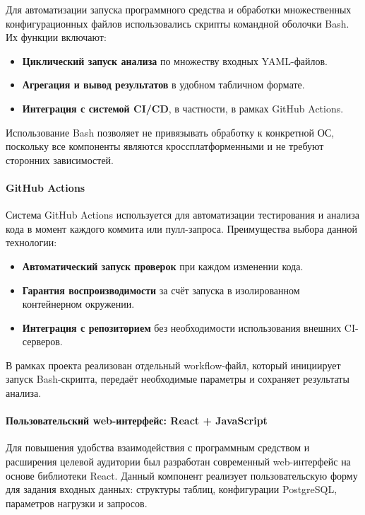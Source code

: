 Для автоматизации запуска программного средства и обработки множественных конфигурационных файлов использовались скрипты командной оболочки Bash. Их функции включают:

\begin{itemize}
  \item \textbf{Циклический запуск анализа} по множеству входных YAML-файлов.
  \item \textbf{Агрегация и вывод результатов} в удобном табличном формате.
  \item \textbf{Интеграция с системой CI/CD}, в частности, в рамках GitHub Actions.
\end{itemize}

Использование Bash позволяет не привязывать обработку к конкретной ОС, поскольку все компоненты являются кроссплатформенными и не требуют сторонних зависимостей.

\paragraph{GitHub Actions}

Система GitHub Actions используется для автоматизации тестирования и анализа кода в момент каждого коммита или пулл-запроса. Преимущества выбора данной технологии:

\begin{itemize}
  \item \textbf{Автоматический запуск проверок} при каждом изменении кода.
  \item \textbf{Гарантия воспроизводимости} за счёт запуска в изолированном контейнерном окружении.
  \item \textbf{Интеграция с репозиторием} без необходимости использования внешних CI-серверов.
\end{itemize}

В рамках проекта реализован отдельный workflow-файл, который инициирует запуск Bash-скрипта, передаёт необходимые параметры и сохраняет результаты анализа.

\paragraph{Пользовательский web-интерфейс: React + JavaScript}

Для повышения удобства взаимодействия с программным средством и расширения целевой аудитории был разработан современный web-интерфейс на основе библиотеки React. Данный компонент реализует пользовательскую форму для задания входных данных: структуры таблиц, конфигурации PostgreSQL, параметров нагрузки и запросов.


